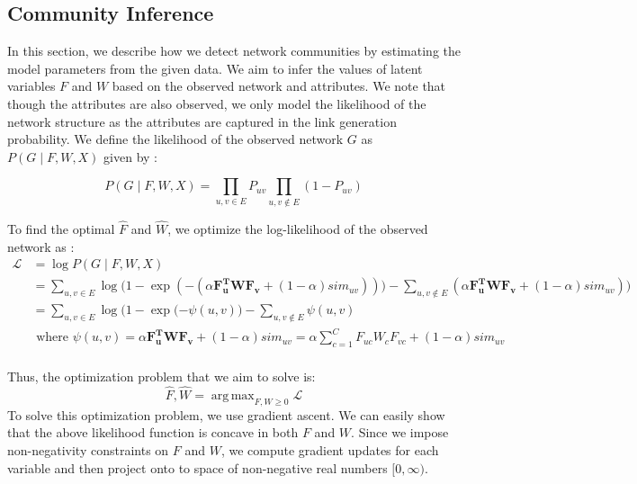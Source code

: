 \documentclass[11pt]{article}
\DeclareMathOperator*{\argmax}{arg\,max}
\begin{document}
\subsection{Community Inference}
In this section, we describe how we detect network communities by estimating the model parameters from the given data. We aim to infer the values of latent variables $F$ and $W$ based on the observed network and attributes. We note that though the attributes are also observed, we only model the likelihood of the network structure as the attributes are captured in the link generation probability. 
We define the likelihood of the observed network $G$ as  $P(G \mid F, W, X)$ given by : 

\[ P(G \mid F, W, X)  = \prod_{u, v \in E} P_{uv} \prod_{u,v \notin E} (1 - P_{uv}) \]

To find the optimal $\hat{F}$ and $\hat{W}$,  we optimize the log-likelihood of the observed network as : 
\begin{align*}
 \mathcal{L}  &= \log P(G \mid F, W, X)  \\
 &= \sum\limits_{u,v \in E} \log \Big( 1 - \exp( - ( \alpha \mathbf{F_u^{T}} \mathbf{W} \mathbf{F_v} + (1 - \alpha) sim_{uv})) \Big) - \sum\limits_{u, v \notin E} ( \alpha \mathbf{F_u^{T}} \mathbf{W} \mathbf{F_v} + (1 - \alpha) sim_{uv})) \\
&= \sum\limits_{u,v \in E} \log \Big( 1 - \exp( - \psi(u,v) \Big) - \sum\limits_{u, v \notin E} \psi(u,v) \\[4pt]
& \text{ where }  \psi(u,v) =  \alpha \mathbf{F_u^{T}} \mathbf{W} \mathbf{F_v} + (1 - \alpha) sim_{uv} = \alpha \sum\limits_{c=1}^C F_{uc} W_c F_{vc} + (1 - \alpha) sim_{uv}\\
\end{align*}


Thus, the optimization problem that we aim to solve is: 
\[ \hat{F}, \hat{W} = \argmax_{F, W \geq 0} \mathcal{L} \]
To solve this optimization problem, we use gradient ascent. We can easily show that the above likelihood function is concave in both $F$ and $W$. Since we impose non-negativity constraints on $F$ and $W$, we compute gradient updates for each variable and then project onto to space of non-negative real numbers $[0, \infty)$. \\
  
\end{document}
